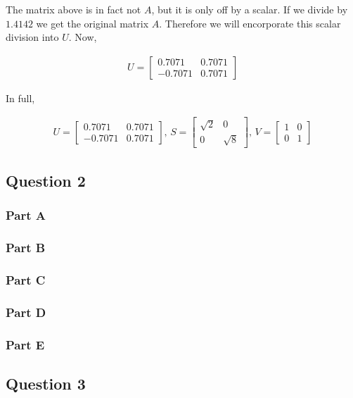 The matrix above is in fact not \(A\), but it is only off by a scalar. If we divide by \(1.4142\) we get the original matrix \(A\). Therefore we will encorporate this scalar division into \(U\). Now,

\begin{eqnarray}
  U = 
  \begin{bmatrix}
    0.7071 & 0.7071 \\
    -0.7071 & 0.7071
  \end{bmatrix}
\end{eqnarray}

In full,

\begin{eqnarray}
  U = 
  \begin{bmatrix}
    0.7071 & 0.7071 \\
    -0.7071 & 0.7071
  \end{bmatrix}
  \text{, }
  S = 
  \begin{bmatrix}
    \sqrt{2} & 0 \\
    0 & \sqrt{8}
  \end{bmatrix}
  \text{, }
  V = 
  \begin{bmatrix}
    1 & 0 \\
    0 & 1
  \end{bmatrix}
\end{eqnarray}
\newpage
\subsection{Question 2}
\subsubsection{Part A}
\subsubsection{Part B}
\subsubsection{Part C}
\subsubsection{Part D}
\subsubsection{Part E}

\newpage
\subsection{Question 3}

